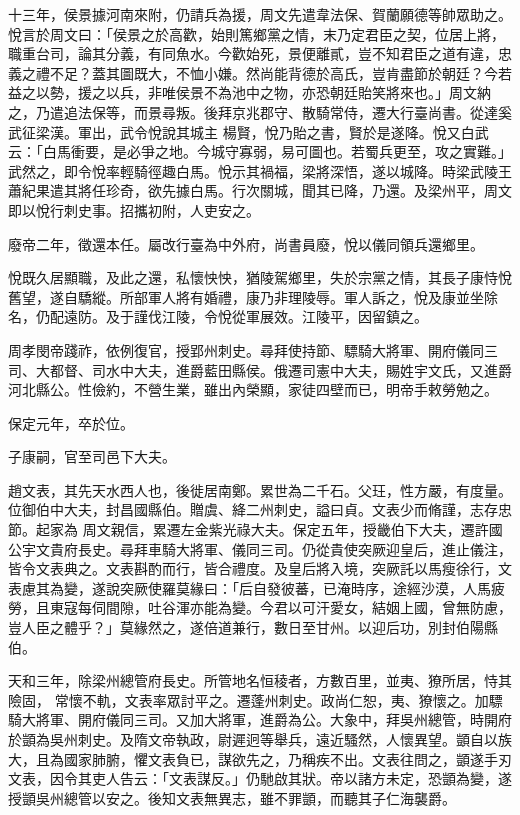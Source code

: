 \begin{pinyinscope}
 十三年，侯景據河南來附，仍請兵為援，周文先遣韋法保、賀蘭願德等帥眾助之。悅言於周文曰：「侯景之於高歡，始則篤鄉黨之情，末乃定君臣之契，位居上將，職重台司，論其分義，有同魚水。今歡始死，景便離貳，豈不知君臣之道有違，忠義之禮不足？蓋其圖既大，不恤小嫌。然尚能背德於高氏，豈肯盡節於朝廷？今若益之以勢，援之以兵，非唯侯景不為池中之物，亦恐朝廷貽笑將來也。」周文納之，乃遣追法保等，而景尋叛。後拜京兆郡守、散騎常侍，遷大行臺尚書。從達奚武征梁漢。軍出，武令悅說其城主
 楊賢，悅乃貽之書，賢於是遂降。悅又白武云：「白馬衝要，是必爭之地。今城守寡弱，易可圖也。若蜀兵更至，攻之實難。」武然之，即令悅率輕騎徑趣白馬。悅示其禍福，梁將深悟，遂以城降。時梁武陵王蕭紀果遣其將任珍奇，欲先據白馬。行次關城，聞其已降，乃還。及梁州平，周文即以悅行刺史事。招攜初附，人吏安之。



 廢帝二年，徵還本任。屬改行臺為中外府，尚書員廢，悅以儀同領兵還鄉里。



 悅既久居顯職，及此之還，私懷怏怏，猶陵駕鄉里，失於宗黨之情，其長子康恃悅舊望，遂自驕縱。所部軍人將有婚禮，康乃非理陵辱。軍人訴之，悅及康並坐除
 名，仍配遠防。及于謹伐江陵，令悅從軍展效。江陵平，因留鎮之。



 周孝閔帝踐祚，依例復官，授郢州刺史。尋拜使持節、驃騎大將軍、開府儀同三司、大都督、司水中大夫，進爵藍田縣侯。俄遷司憲中大夫，賜姓宇文氏，又進爵河北縣公。性儉約，不營生業，雖出內榮顯，家徒四壁而已，明帝手敕勞勉之。



 保定元年，卒於位。



 子康嗣，官至司邑下大夫。



 趙文表，其先天水西人也，後徙居南鄭。累世為二千石。父玨，性方嚴，有度量。位御伯中大夫，封昌國縣伯。贈虞、絳二州刺史，謚曰貞。文表少而脩謹，志存忠節。起家為
 周文親信，累遷左金紫光祿大夫。保定五年，授畿伯下大夫，遷許國公宇文貴府長史。尋拜車騎大將軍、儀同三司。仍從貴使突厥迎皇后，進止儀注，皆令文表典之。文表斟酌而行，皆合禮度。及皇后將入境，突厥託以馬瘦徐行，文表慮其為變，遂說突厥使羅莫緣曰：「后自發彼蕃，已淹時序，途經沙漠，人馬疲勞，且東寇每伺間隙，吐谷渾亦能為變。今君以可汗愛女，結姻上國，曾無防慮，豈人臣之體乎？」莫緣然之，遂倍道兼行，數日至甘州。以迎后功，別封伯陽縣伯。



 天和三年，除梁州總管府長史。所管地名恒稜者，方數百里，並夷、獠所居，恃其險固，
 常懷不軌，文表率眾討平之。遷蓬州刺史。政尚仁恕，夷、獠懷之。加驃騎大將軍、開府儀同三司。又加大將軍，進爵為公。大象中，拜吳州總管，時開府於顗為吳州刺史。及隋文帝執政，尉遲迥等舉兵，遠近騷然，人懷異望。顗自以族大，且為國家肺腑，懼文表負已，謀欲先之，乃稱疾不出。文表往問之，顗遂手刃文表，因令其吏人告云：「文表謀反。」仍馳啟其狀。帝以諸方未定，恐顗為變，遂授顗吳州總管以安之。後知文表無異志，雖不罪顗，而聽其子仁海襲爵。




\end{pinyinscope}
